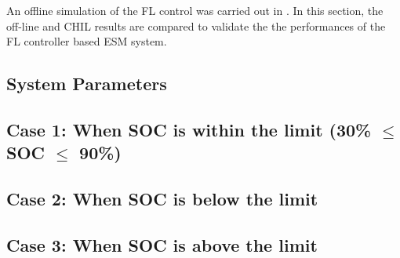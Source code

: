 An offline simulation of the FL control was carried out in \cite{khan2017fuzzy}.
In this section, the off-line and CHIL results are compared to validate the the performances of the FL controller based ESM system. 
\subsection{System Parameters}

\subsection{Case 1: When SOC is within the limit (30\% $\leq$ SOC $\leq$ 90\%)}

\subsection{Case 2: When SOC is below the limit}

\subsection{Case 3: When SOC is above the limit}

